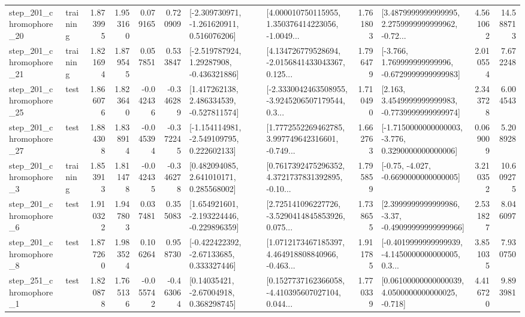 \begin{tabular}{llrrrrllrlrr}
  step\_201\_chromophore\_20 &  training &      1.873995 &    1.953160 &      0.079165 &  0.720909 &   [-2.309730971, -1.261620911, 0.516076206] &  [4.000010750115955, 1.350376414223056, -1.0049... &       1.761803 &  [3.4879999999999995, 2.2759999999999962, -0.72... &            4.561062 &         14.588713 \\
  step\_201\_chromophore\_21 &  training &      1.821694 &    1.879545 &      0.057851 &  0.533847 &    [-2.519787924, 1.29287908, -0.436321886] &  [4.134726779528694, -2.0156841433043367, 0.125... &       1.796479 &   [-3.766, 1.769999999999996, -0.6729999999999983] &            2.010554 &          7.672248 \\
  step\_201\_chromophore\_25 &      test &      1.866076 &    1.823640 &     -0.042436 & -0.346289 &    [1.417262138, 2.486334539, -0.527811574] &  [-2.3330042463508955, -3.9245206507179544, 0.3... &       1.710490 &   [2.163, 3.4549999999999983, -0.7739999999999974] &            2.343728 &          6.004543 \\
  step\_201\_chromophore\_27 &      test &      1.884308 &    1.838914 &     -0.045394 & -0.372245 &   [-1.154114981, -2.549109795, 0.222602133] &  [1.7772552269462785, 3.997749642316601, -0.749... &       1.662763 &  [-1.7150000000000003, -3.776, 0.3290000000000006] &            0.069009 &          5.208928 \\
   step\_201\_chromophore\_3 &  training &      1.853913 &    1.811478 &     -0.042435 & -0.346278 &     [0.482094085, 2.641010171, 0.285568002] &  [0.7617392475296352, 4.3721737831392895, -0.10... &       1.795859 &               [-0.75, -4.027, -0.6690000000000005] &            3.210352 &         10.609275 \\
   step\_201\_chromophore\_6 &      test &      1.910322 &    1.947803 &      0.037481 &  0.355083 &   [1.654921601, -2.193224446, -0.229896359] &  [2.725141096227726, -3.5290414845853926, 0.075... &       1.738655 &  [2.3999999999999986, -3.37, -0.49099999999999966] &            2.531827 &          8.046097 \\
   step\_201\_chromophore\_8 &      test &      1.877260 &    1.983524 &      0.106264 &  0.958730 &    [-0.422422392, -2.67133685, 0.333327446] &  [1.0712173467185397, 4.464918808840966, -0.463... &       1.911785 &  [-0.4019999999999939, -4.1450000000000005, 0.3... &            3.851035 &          7.930750 \\
   step\_251\_chromophore\_1 &      test &      1.820878 &    1.765136 &     -0.055742 & -0.463064 &      [0.14035421, -2.67004918, 0.368298745] &  [0.1527737162366058, -4.410395607027104, 0.044... &       1.770339 &  [0.06100000000000039, 4.0500000000000025, -0.718] &            4.416720 &          9.893981 \\

\end{tabular}
